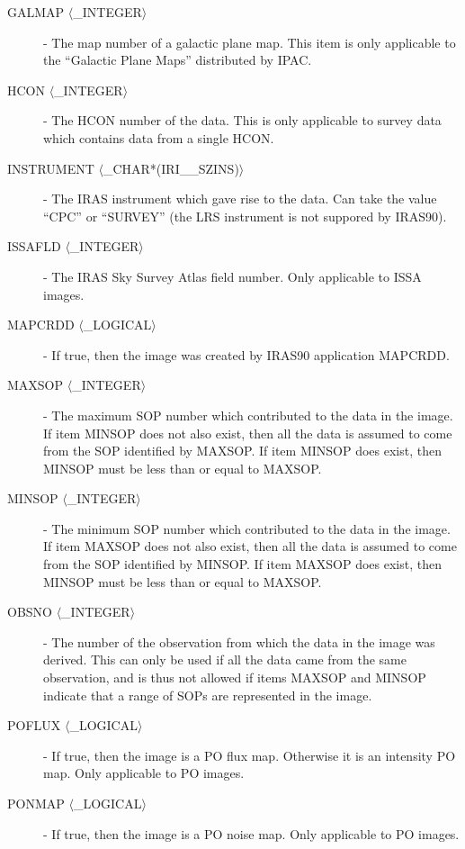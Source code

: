 \begin{description}
\item [GALMAP $\langle$\_INTEGER$\rangle$] - The map number of a galactic plane map. This item
is only applicable to the ``Galactic Plane Maps'' distributed by IPAC.

\item [HCON $\langle$\_INTEGER$\rangle$] - The HCON number of the data. This is only applicable
to survey data which contains data from a single HCON. 

\item [INSTRUMENT $\langle$\_CHAR*(IRI\_\_SZINS)$\rangle$] - The IRAS instrument
which gave rise to the data. Can take the value ``CPC'' or ``SURVEY'' (the LRS
instrument is not suppored by IRAS90). 

\item [ISSAFLD $\langle$\_INTEGER$\rangle$] - The IRAS Sky Survey Atlas 
field number. Only applicable to ISSA images. 

\item [MAPCRDD $\langle$\_LOGICAL$\rangle$] - If true, then the image was 
created by IRAS90 application MAPCRDD. 

\item [MAXSOP $\langle$\_INTEGER$\rangle$] - The maximum SOP number which contributed to the
data in the image. If item MINSOP does not also exist, then all the data is
assumed to come from the SOP identified by MAXSOP. If item MINSOP does exist,
then MINSOP must be less than or equal to MAXSOP. 

\item [MINSOP $\langle$\_INTEGER$\rangle$] - The minimum SOP number which contributed to the
data in the image. If item MAXSOP does not also exist, then all the data is
assumed to come from the SOP identified by MINSOP. If item MAXSOP does exist,
then MINSOP must be less than or equal to MAXSOP. 

\item [OBSNO $\langle$\_INTEGER$\rangle$] - The number of the observation from which the data in
the image was derived. This can only be used if all the data came from the same
observation, and is thus not allowed if items MAXSOP and MINSOP indicate that a
range of SOPs are represented in the image. 

\item [POFLUX $\langle$\_LOGICAL$\rangle$] - If true, then the image is a PO
flux map. Otherwise it is an intensity PO map. Only applicable to PO
images. 

\item [PONMAP $\langle$\_LOGICAL$\rangle$] - If true, then the image is a PO
noise map. Only applicable to PO images. 


\end{description}
